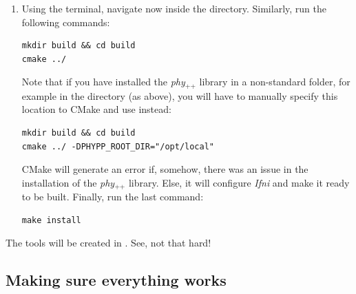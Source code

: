 \documentclass[12pt,a4paper]{article}
\newcommand{\phypp}{\textit{phy}$_{\text{++}}$\xspace}
\newcommand{\ifni}{\textit{Ifni}\xspace}
\begin{document}
\begin{enumerate}
Here, the ``...'' have to be replaced by the directory in which you want to install the library. For example, if you want to install it in , just replace ``...'' by . This will install the library headers in . This can of course be combined with the manual installation directories for WCSlib and cfitsio.

If all goes well, this will configure the \phypp library and prepare it for installation. The script will most likely warn you about missing dependencies, but this is ok since none of these are needed for \ifni. Just make sure that cfitsio and WCSlib are found correctly, then install the library with the following command:

\begin{verbatim}
sudo make install
# or just 'make install' if you do not have root access
source ~/.phypprc
\end{verbatim}

\item Using the terminal, navigate now inside the  directory. Similarly, run the following commands:
\begin{verbatim}
mkdir build && cd build
cmake ../
\end{verbatim}

Note that if you have installed the \phypp library in a non-standard folder, for example in the  directory (as above), you will have to manually specify this location to CMake and use instead:
\begin{verbatim}
mkdir build && cd build
cmake ../ -DPHYPP_ROOT_DIR="/opt/local"
\end{verbatim}

CMake will generate an error if, somehow, there was an issue in the installation of the \phypp library. Else, it will configure \ifni and make it ready to be built. Finally, run the last command:
\begin{verbatim}
make install
\end{verbatim}
\end{enumerate}

The  tools will be created in . See, not that hard!

\subsection{Making sure everything works}
\end{document}
